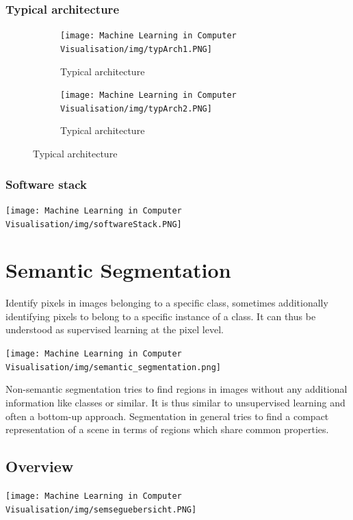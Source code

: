 \documentclass[x11names,11pt,a4paper]{article}
\theoremstyle{definition}
\begin{document}
\subsubsection{Typical architecture}
\begin{figure}[H]
     \centering
     \begin{subfigure}[b]{0.45\textwidth}
         \centering
         \texttt{[image: Machine Learning in Computer Visualisation/img/typArch1.PNG]}
         \caption{Typical architecture}
     \end{subfigure}
     \hfill
     \begin{subfigure}[b]{0.45\textwidth}
         \centering
         \texttt{[image: Machine Learning in Computer Visualisation/img/typArch2.PNG]}
         \caption{Typical architecture}
     \end{subfigure}
\end{figure}

\subsubsection{Software stack}
\begin{center}
	\texttt{[image: Machine Learning in Computer Visualisation/img/softwareStack.PNG]}
\end{center}

\section{Semantic Segmentation}
Identify pixels in images belonging to a specific class, sometimes additionally identifying pixels to belong to a specific instance of a class. It can thus be understood as supervised learning at the pixel level.
\begin{center}
	\texttt{[image: Machine Learning in Computer Visualisation/img/semantic\_segmentation.png]}
\end{center}
Non-semantic segmentation tries to find regions in images without any additional information like classes or similar. It is thus similar to unsupervised learning and often a bottom-up approach. Segmentation in general tries to find a compact representation of a scene in terms of regions which share common properties.
\subsection{Overview}
\begin{center}
	\texttt{[image: Machine Learning in Computer Visualisation/img/semseguebersicht.PNG]}
\end{center}
\end{document}
